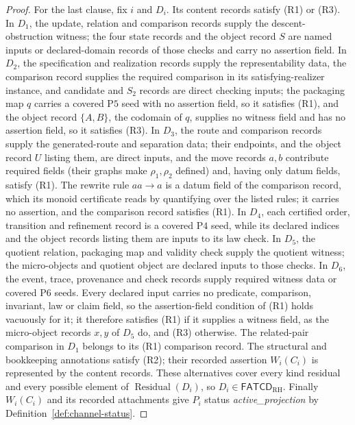 \documentclass[11pt]{article}
\theoremstyle{definition}
\newcommand{\FATCD}{\ensuremath{\mathsf{FATCD}}}
\newcommand{\Residual}[1]{\ensuremath{\operatorname{Residual}\!\left(#1\right)}}
\newcommand{\activeproj}{\textit{active\_\allowbreak projection}}
\newcommand{\Pfour}{\ensuremath{\mathrm{P4}}}
\newcommand{\Pfive}{\ensuremath{\mathrm{P5}}}
\newcommand{\Psix}{\ensuremath{\mathrm{P6}}}
\begin{document}
\begin{proof}
For the last clause, fix \(i\) and \(D_i\). Its content records satisfy (R1)
or (R3). In \(D_1\), the update, relation and comparison records supply the
descent-obstruction witness; the four state records and the object record
\(S\) are named inputs or declared-domain records of those checks and carry no assertion field. In \(D_2\), the specification and realization
records supply the representability data, the comparison record supplies the
required comparison in its satisfying-realizer instance, and candidate and \(S_2\) records are direct checking
inputs; the packaging map
\(q\) carries a covered \Pfive{} seed with no assertion field, so it satisfies
(R1), and the object record \(\{A,B\}\), the codomain of \(q\), supplies no
witness field and has no assertion field, so it satisfies (R3). In \(D_3\), the route and
comparison records supply the generated-route and separation data; their
endpoints, and the object record \(U\) listing them, are direct inputs, and the move records \(a,b\) contribute required
fields (their graphs make \(\rho_1,\rho_2\) defined) and, having only datum
fields, satisfy (R1). The rewrite rule \(aa\to a\) is a datum field of the comparison record,
which its monoid certificate reads by quantifying over the listed rules; it
carries no assertion, and the comparison record satisfies (R1). In \(D_4\), each certified order, transition and
refinement record is a covered \Pfour{} seed, while its declared indices and
the object records listing them are inputs to its law check. In \(D_5\), the quotient relation, packaging map and
validity check supply the quotient witness; the micro-objects and quotient
object are declared inputs to those checks. In \(D_6\), the event, trace,
provenance and check records supply required witness data or covered
\Psix{} seeds. Every declared input carries no predicate, comparison,
invariant, law or claim field, so the assertion-field condition of (R1) holds
vacuously for it; it therefore satisfies (R1) if it supplies a witness field,
as the micro-object records \(x,y\) of \(D_5\) do, and (R3) otherwise. The
related-pair comparison in \(D_1\) belongs to its (R1) comparison record. The
structural and bookkeeping annotations satisfy (R2); their recorded assertion
\(W_i(C_i)\) is represented by the content records. These alternatives cover
every kind residual and every possible element of \(\Residual{D_i}\), so
\(D_i\in\FATCD_{\mathrm{RH}}\). Finally \(W_i(C_i)\) and its recorded
attachments give \(P_i\) status \activeproj{} by
Definition~\ref{def:channel-status}.
\end{proof}
\end{document}
